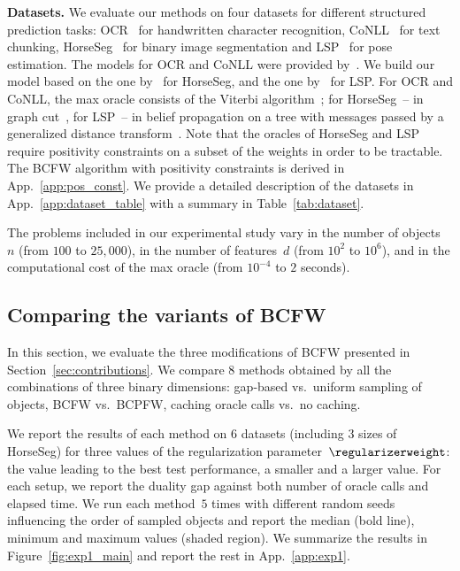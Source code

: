 \documentclass{article}
\begin{document}
%
\textbf{Datasets.}
We evaluate our methods on four datasets for different structured prediction tasks: OCR~\citep{Taskar2003} for handwritten character recognition, CoNLL~\citep{Sang2000} for text chunking, HorseSeg~\citep{kolesnikov2014closed} for binary image segmentation and LSP~\citep{Johnson10} for pose estimation.
The models for OCR and CoNLL were provided by~\citet{lacosteJulien13bcfw}. We build our model based on the one by~\citet{kolesnikov2014closed} for HorseSeg, and the one by~\citet{Chen_NIPS14} for LSP.
For OCR and CoNLL, the max oracle consists of the Viterbi algorithm~\citep{Viterbi67}; for HorseSeg~-- in graph cut~\citep{boykov2004graphcut}, for LSP~-- in belief propagation on a tree with messages passed by a generalized distance transform~\citep{felzenszwalb2005distTrans}.
Note that the oracles of HorseSeg and LSP require positivity constraints on a subset of the weights in order to be tractable. 
The BCFW algorithm with positivity constraints is derived in App.~\ref{app:pos_const}.
We provide a detailed description of the datasets in App.~\ref{app:dataset_table} with a summary in Table~\ref{tab:dataset}.

The problems included in our experimental study vary in the number of objects~$n$ (from $100$ to $25,\!000$), in the number of features~$d$ (from $10^2$ to $10^6$), and in the computational cost of the max oracle (from $10^{-4}$ to $2$ seconds).

%
%
%
%
%


%
\subsection{Comparing the variants of  BCFW \label{subsec:exp1}}




%
In this section, we evaluate the three modifications of BCFW presented in Section~\ref{sec:contributions}.
We compare 8 methods obtained by all the combinations of three binary dimensions: 
gap-based vs.\ uniform sampling of objects, BCFW vs.\ BCPFW, caching oracle calls vs.\ no caching.
%
%

We report the results of each method on 6 datasets (including 3 sizes of HorseSeg) for three values of the regularization parameter~$\regularizerweight$: the value leading to the best test performance, a smaller and a larger value. For each setup, we report the duality gap against both number of oracle calls and elapsed time.
We run each method~$5$ times with different random seeds influencing the order of sampled objects and report the median (bold line), minimum and maximum values (shaded region).
We summarize the results in Figure~\ref{fig:exp1_main} and report the rest in App.~\ref{app:exp1}.
\end{document}
